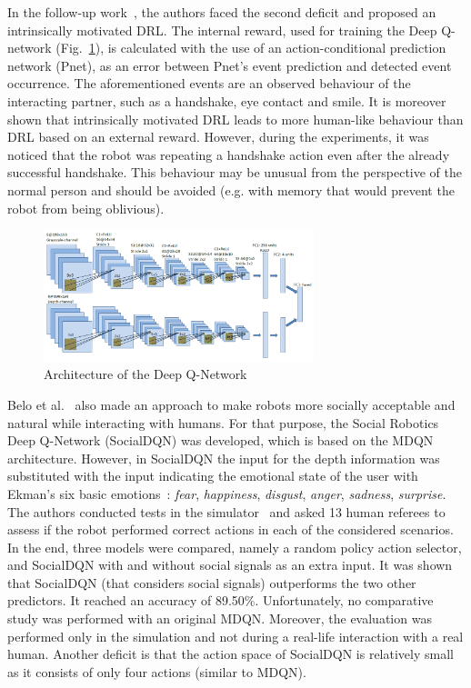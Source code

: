 \documentclass[thesis]{mas_proposal}
\begin{document}
In the follow-up work~\cite{Qureshi2018}, the authors faced the second deficit and proposed an intrinsically motivated DRL. The internal reward, used for training the Deep Q-network (Fig.~\ref{fig:mdqn}), is calculated with the use of an action-conditional prediction network (Pnet), as an error between Pnet's event prediction and detected event occurrence. The aforementioned events are an observed behaviour of the interacting partner, such as a handshake, eye contact and smile. It is moreover shown that intrinsically motivated DRL leads to more human-like behaviour than DRL based on an external reward. However, during the experiments, it was noticed that the robot was repeating a handshake action even after the already successful handshake. This behaviour may be unusual from the perspective of the normal person and should be avoided (e.g. with memory that would prevent the robot from being oblivious).

\begin{figure}[htb!]
	\centering
	\includegraphics[width=0.7\textwidth]{images/architecture/mdqn.png}
	\caption{Architecture of the Deep Q-Network~\cite{Qureshi2018}}
	\label{fig:mdqn}
\end{figure}

Belo et al.~\cite{Belo2022} also made an approach to make robots more socially acceptable and natural while interacting with humans. For that purpose, the Social Robotics Deep Q-Network (SocialDQN) was developed, which is based on the MDQN architecture. However, in SocialDQN the input for the depth information was substituted with the input indicating the emotional state of the user with Ekman's six basic emotions~\cite{ekman1971constants}: \emph{fear}, \emph{happiness}, \emph{disgust}, \emph{anger}, \emph{sadness}, \emph{surprise}. The authors conducted tests in the simulator~\cite{Belo2021} and asked 13 human referees to assess if the robot performed correct actions in each of the considered scenarios. In the end, three models were compared, namely a random policy action selector, and SocialDQN with and without social signals as an extra input. It was shown that SocialDQN (that considers social signals) outperforms the two other predictors. It reached an accuracy of 89.50\%. Unfortunately, no comparative study was performed with an original MDQN. Moreover, the evaluation was performed only in the simulation and not during a real-life interaction with a real human. Another deficit is that the action space of SocialDQN is relatively small as it consists of only four actions (similar to MDQN).
 
\end{document}
